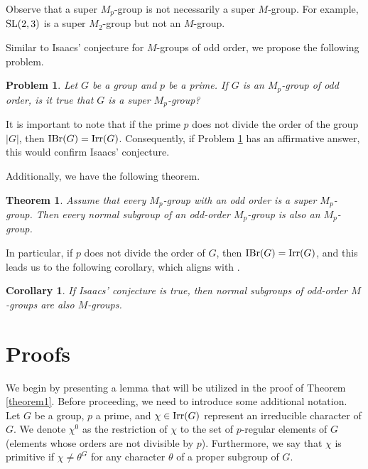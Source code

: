 \documentclass[12pt]{amsart}
\newtheorem{thm}[theorem]{Theorem}
\newtheorem{cor}[theorem]{Corollary}
\newtheorem{prob}[theorem]{Problem}
\theoremstyle{remark}
\numberwithin{equation}{section}
\begin{document}
Observe that a super $M_{p}$-group is not necessarily a super $M$-group.
For example, ${\rm SL}(2, 3)$ is a super $M_{2}$-group but not an $M$-group.

Similar to Isaacs' conjecture for $M$-groups of odd order,
we propose the following problem.

\begin{prob}\label{problem1}
Let $G$ be a group and $p$ be a prime.
If $G$ is an $M_{p}$-group of odd order,
is it true that $G$ is a super $M_{p}$-group?
\end{prob}

It is important to note that if the prime $p$ does not divide the order of the group $|G|$,
then ${\rm IBr}(G)={\rm Irr}(G)$.
Consequently, if Problem \ref{problem1} has an affirmative answer, this would confirm 
Isaacs' conjecture.

Additionally, we have the following theorem.

\begin{thm}\label{theorem2}
Assume that every $M_{p}$-group with an odd order is a super $M_{p}$-group.
Then every normal subgroup of an odd-order $M_{p}$-group is also an $M_{p}$-group.
\end{thm}

In particular, if $p$ does not divide the order of $G$,
then ${\rm IBr}(G)={\rm Irr}(G)$, and this leads us to the following corollary, which aligns with 
 \cite[Corollary 2.2]{LewisProc2010}.

\begin{cor}\label{cor1}
If Isaacs' conjecture is true,
then normal subgroups of odd-order $M$-groups are also $M$-groups.
\end{cor}












\section{Proofs}\label{sec2}
We begin by presenting a lemma that will be utilized in the proof of Theorem \ref{theorem1}. 
Before proceeding, we need to introduce some additional notation. 
Let $G$ be a group, $p$ a prime, and $\chi\in {\rm Irr}(G)$ represent an irreducible character of $G$.
We denote $\chi^{0}$ as the restriction of $\chi$ to the set of $p$-regular elements
of $G$ (elements whose orders are not divisible by $p$). Furthermore, we say that  
$\chi$ is primitive if $\chi\neq \theta^{G}$ for any character $\theta$
of a proper subgroup of $G$.
\end{document}
